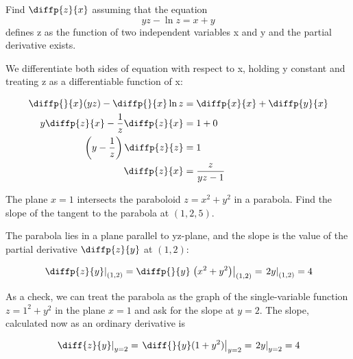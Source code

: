 \documentclass[12pt,a4paper,draft]{article}
\begin{document}
\begin{example}
    Find \(\diffp{z}{x}\) assuming that the equation
    \[yz -\ln z = x+y\]
    defines z as the function of two independent variables x and y and the partial derivative exists.
\end{example}

\begin{solution}
    We differentiate both sides of equation with respect to x, holding y constant and treating z as a differentiable function of x:

    \begin{align*}
        \diffp{}{x}(yz) - \diffp{}{x}\ln z &= \diffp{x}{x} +\diffp{y}{x}\\
        y \diffp{z}{x} - \frac{1}{z} \diffp{z}{x} &= 1 + 0\\
        \left(y - \frac{1}{z}\right) \diffp{z}{z} &= 1\\
        \diffp{z}{x} &= \frac{z}{yz-1}
    \end{align*}
    

\end{solution}

\newpage

\begin{example}
    The plane \(x=1\) intersects the paraboloid \(z = x^2 + y^2\) in a parabola.
    Find the slope of the tangent to the parabola at \((1,2,5)\).
    


    \begin{solution}
        The parabola lies in a plane parallel to yz-plane, and the slope is the value of the partial derivative \(\diffp{z}{y}\) at \((1,2)\):

        \[\left. \diffp{z}{y} \right|_{(1,2)} = \diffp{}{y} \left. \left(x^2 + y^2\right)\right|_{(1,2)} = \left. 2y \right|_{(1,2)} = 4\]

        As a check, we can treat the parabola as the graph of the single-variable function \(z= 1^2 + y^2 \) in the plane \(x = 1\) and ask for the slope at \(y=2\). The slope, 
        calculated now as an ordinary derivative is 

        \[\left. \diff{z}{y}\right|_{y=2} =  \left. \diff{}{y}(1+y^2) \right|_{y=2} =  \left. 2y\right|_{y=2} = 4\]

    \end{solution}

    


\end{example}
\end{document}
